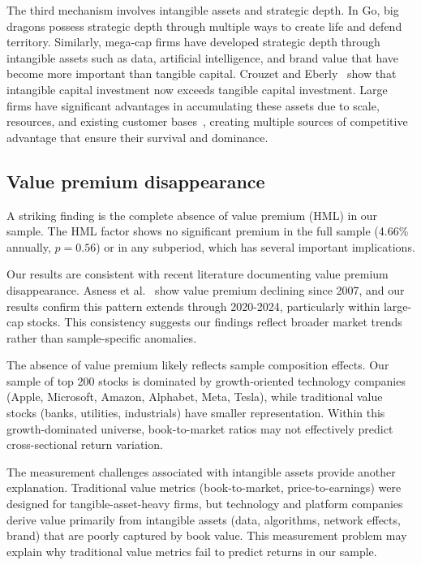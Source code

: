 \documentclass[10pt,letterpaper]{article}
\begin{document}
The third mechanism involves intangible assets and strategic depth. In Go, big dragons possess strategic depth through multiple ways to create life and defend territory. Similarly, mega-cap firms have developed strategic depth through intangible assets such as data, artificial intelligence, and brand value that have become more important than tangible capital. Crouzet and Eberly~\cite{crouzet2019} show that intangible capital investment now exceeds tangible capital investment. Large firms have significant advantages in accumulating these assets due to scale, resources, and existing customer bases~\cite{haskel2018}, creating multiple sources of competitive advantage that ensure their survival and dominance.

\subsection*{Value premium disappearance}

A striking finding is the complete absence of value premium (HML) in our sample. The HML factor shows no significant premium in the full sample (4.66\% annually, $p=0.56$) or in any subperiod, which has several important implications.

Our results are consistent with recent literature documenting value premium disappearance. Asness et al.~\cite{asness2018} show value premium declining since 2007, and our results confirm this pattern extends through 2020-2024, particularly within large-cap stocks. This consistency suggests our findings reflect broader market trends rather than sample-specific anomalies.

The absence of value premium likely reflects sample composition effects. Our sample of top 200 stocks is dominated by growth-oriented technology companies (Apple, Microsoft, Amazon, Alphabet, Meta, Tesla), while traditional value stocks (banks, utilities, industrials) have smaller representation. Within this growth-dominated universe, book-to-market ratios may not effectively predict cross-sectional return variation.

The measurement challenges associated with intangible assets provide another explanation. Traditional value metrics (book-to-market, price-to-earnings) were designed for tangible-asset-heavy firms, but technology and platform companies derive value primarily from intangible assets (data, algorithms, network effects, brand) that are poorly captured by book value. This measurement problem may explain why traditional value metrics fail to predict returns in our sample.
\end{document}
